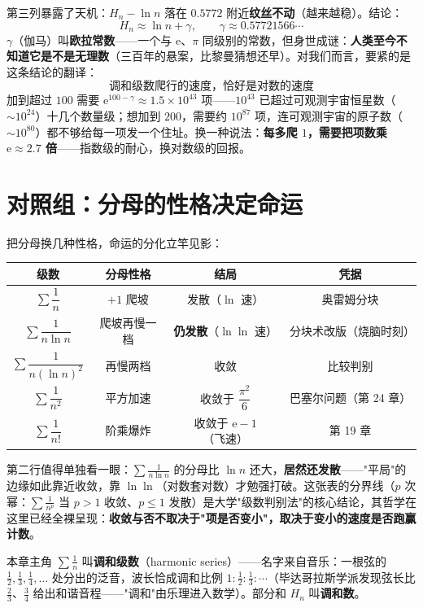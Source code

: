 第三列暴露了天机：$H_n - \ln n$ 落在 $0.5772$ 附近\textbf{纹丝不动}（越来越稳）。结论：
\[
H_n \approx \ln n + \gamma, \qquad \gamma \approx 0.57721566\cdots
\]
$\gamma$（伽马）叫\textbf{欧拉常数}——一个与 $\mathrm{e}$、$\pi$ 同级别的常数，但身世成谜：\textbf{人类至今不知道它是不是无理数}（三百年的悬案，比黎曼猜想还早）。对我们而言，要紧的是这条结论的翻译：
\[
\boxed{\;\text{调和级数爬行的速度，恰好是对数的速度}\;}
\]
加到超过 $100$ 需要 $\mathrm{e}^{100 - \gamma} \approx 1.5\times10^{43}$ 项——$10^{43}$ 已超过可观测宇宙恒星数（$\sim10^{24}$）十几个数量级；想加到 $200$，需要约 $10^{87}$ 项，连可观测宇宙的原子数（$\sim10^{80}$）都不够给每一项发一个住址。换一种说法：\textbf{每多爬 $1$，需要把项数乘 $\mathrm{e}\approx2.7$ 倍}——指数级的耐心，换对数级的回报。

\section{对照组：分母的性格决定命运}

把分母换几种性格，命运的分化立竿见影：

\begin{center}
\begin{tabular}{cccc}
\toprule
级数 & 分母性格 & 结局 & 凭据 \\
\midrule
$\sum\dfrac1n$ & $+1$ 爬坡 & 发散（$\ln$ 速） & 奥雷姆分块 \\
$\sum\dfrac{1}{n\ln n}$ & 爬坡再慢一档 & \textbf{仍发散}（$\ln\ln$ 速） & 分块术改版（烧脑时刻） \\
$\sum\dfrac{1}{n(\ln n)^2}$ & 再慢两档 & 收敛 & 比较判别 \\
$\sum\dfrac{1}{n^2}$ & 平方加速 & 收敛于 $\dfrac{\pi^2}{6}$ & 巴塞尔问题（第 24 章） \\
$\sum\dfrac1{n!}$ & 阶乘爆炸 & 收敛于 $\mathrm{e}-1$（飞速） & 第 19 章 \\
\bottomrule
\end{tabular}
\end{center}

第二行值得单独看一眼：$\sum\tfrac{1}{n\ln n}$ 的分母比 $\ln n$ 还大，\textbf{居然还发散}——"平局"的边缘如此靠近收敛，靠 $\ln\ln$（对数套对数）才勉强打破。这张表的分界线（$p$ 次幂：$\sum \tfrac1{n^p}$ 当 $p > 1$ 收敛、$p\le1$ 发散）是大学"级数判别法"的核心结论，其哲学在这里已经全裸呈现：\textbf{收敛与否不取决于"项是否变小"，取决于变小的速度是否跑赢计数}。

\begin{cidian}
本章主角 $\sum\tfrac1n$ 叫\textbf{调和级数}（harmonic series）——名字来自音乐：一根弦的 $\tfrac12, \tfrac13, \tfrac14,\dots$ 处分出的泛音，波长恰成调和比例 $1:\tfrac12:\tfrac13:\cdots$（毕达哥拉斯学派发现弦长比 $\tfrac23$、$\tfrac34$ 给出和谐音程——"调和"由乐理进入数学）。部分和 $H_n$ 叫\textbf{调和数}。
\end{cidian}

